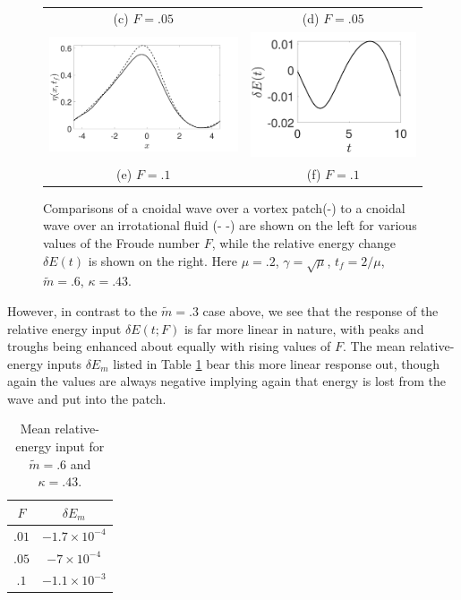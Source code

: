\documentclass[a4paper,11pt]{article}
\begin{document}
\begin{figure}
\begin{tabular}{cc}
(c)  $F=.05$ & (d)  $F=.05$\\
\includegraphics[width=.45\textwidth]{profiles_wm_10_modu_pt6} & \includegraphics[width=.4\textwidth]{energy_wm_10_modu_pt6}\\
(e)  $F=.1$ & (f)  $F=.1$
\end{tabular}
\caption{Comparisons of a cnoidal wave over a vortex patch(-) to a cnoidal wave over an irrotational fluid (- -) are shown on the left for various values of the Froude number $F$, while the relative energy change $\delta E(t)$ is shown on the right.  Here $\mu=.2$, $\gamma=\sqrt{\mu}$, $t_{f}=2/\mu$, $\tilde{m}=.6$, $\kappa = .43$.}
\label{fig:midsolwave}
\end{figure}

However, in contrast to the $\tilde{m}=.3$ case above, we see that the response of the relative energy input $\delta E(t;F)$ is far more linear in nature, with peaks and troughs being enhanced about equally with rising values of $F$.  The mean relative-energy inputs $\delta E_{m}$ listed in Table \ref{tab:midsolmean} bear this more linear response out, though again the values are always negative implying again that energy is lost from the wave and put into the patch.  
\begin{table}
\centering
\begin{tabular}{c|c}
$F$ & $\delta E_{m}$ \\
\hline
$.01$ & $-1.7\times 10^{-4}$\\
$.05$ & $-7\times 10^{-4}$\\
$.1$ & $-1.1\times 10^{-3}$
\end{tabular}
\caption{Mean relative-energy input for $\tilde{m}=.6$ and $\kappa=.43$.}
\label{tab:midsolmean}
\end{table}
\end{document}
